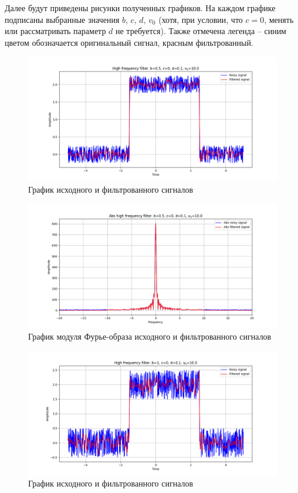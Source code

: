 \documentclass[a4paper, 16pt]{article}
\begin{document}
    
    Далее будут приведены рисунки полученных графиков. На каждом графике подписаны выбранные значения $b,\,c,\,d,\,v_0$
    (хотя, при условии, что $c=0$, менять или рассматривать параметр $d$ не требуется). Также отмечена легенда -- синим цветом
    обозначается оригинальный сигнал, красным фильтрованный.
    \begin{figure}[!htb]
        \centering
        \includegraphics[scale=0.485]{1_u_flt_u_nohigh.png}
        \captionsetup{skip=0pt}
        \caption{График исходного и фильтрованного сигналов}
        \label{fig:fig1}
    \end{figure}
    \newpage
    \begin{figure}[!htb]
        \centering
        \includegraphics[scale=0.485]{1_abs_u_U_nohigh.png}
        \captionsetup{skip=0pt}
        \caption{График модуля Фурье-образа исходного и фильтрованного сигналов}
        \label{fig:fig2}
    \end{figure}
    \begin{figure}[!htb]
        \centering
        \includegraphics[scale=0.485]{2_u_flt_u_nohigh.png}
        \captionsetup{skip=0pt}
        \caption{График исходного и фильтрованного сигналов}
        \label{fig:fig3}
    \end{figure}
\end{document}
